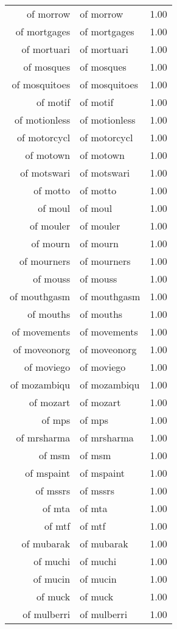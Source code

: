 \begin{table}[ht]
\begin{tabular}{rlr}
  of morrow & of morrow & 1.00 \\ 
  of mortgages & of mortgages & 1.00 \\ 
  of mortuari & of mortuari & 1.00 \\ 
  of mosques & of mosques & 1.00 \\ 
  of mosquitoes & of mosquitoes & 1.00 \\ 
  of motif & of motif & 1.00 \\ 
  of motionless & of motionless & 1.00 \\ 
  of motorcycl & of motorcycl & 1.00 \\ 
  of motown & of motown & 1.00 \\ 
  of motswari & of motswari & 1.00 \\ 
  of motto & of motto & 1.00 \\ 
  of moul & of moul & 1.00 \\ 
  of mouler & of mouler & 1.00 \\ 
  of mourn & of mourn & 1.00 \\ 
  of mourners & of mourners & 1.00 \\ 
  of mouss & of mouss & 1.00 \\ 
  of mouthgasm & of mouthgasm & 1.00 \\ 
  of mouths & of mouths & 1.00 \\ 
  of movements & of movements & 1.00 \\ 
  of moveonorg & of moveonorg & 1.00 \\ 
  of moviego & of moviego & 1.00 \\ 
  of mozambiqu & of mozambiqu & 1.00 \\ 
  of mozart & of mozart & 1.00 \\ 
  of mps & of mps & 1.00 \\ 
  of mrsharma & of mrsharma & 1.00 \\ 
  of msm & of msm & 1.00 \\ 
  of mspaint & of mspaint & 1.00 \\ 
  of mssrs & of mssrs & 1.00 \\ 
  of mta & of mta & 1.00 \\ 
  of mtf & of mtf & 1.00 \\ 
  of mubarak & of mubarak & 1.00 \\ 
  of muchi & of muchi & 1.00 \\ 
  of mucin & of mucin & 1.00 \\ 
  of muck & of muck & 1.00 \\ 
  of mulberri & of mulberri & 1.00 \\ 

\end{tabular}
\end{table}

